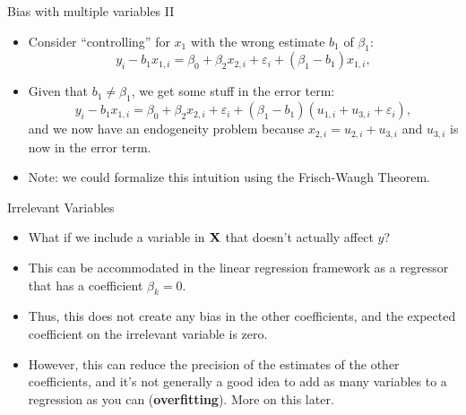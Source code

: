 \documentclass[aspectratio=169,11pt]{beamer}
\begin{document}
\begin{frame}{Bias with multiple variables II}
\begin{itemize}
		\item Consider ``controlling'' for $x_1$ with the wrong estimate $b_1$ of $\beta_1$:\[
					y_i - b_1 x_{1,i} = \beta_0 + \beta_2 x_{2,i}  + \varepsilon_i + (\beta_1 - b_1) x_{1,i},
\]

\medskip
		\item Given that $b_1 \ne \beta_1$, we get some stuff in the error term:\[
					y_i - b_1 x_{1,i} = \beta_0 + \beta_2 x_{2,i}  + \varepsilon_i + (\beta_1 - b_1) (u_{1,i} + u_{3,i} + \varepsilon_i),
\]
and we now have an endogeneity problem because $x_{2,i} = u_{2,i} + u_{3,i}$ and $u_{3,i}$ is now in the error term.

\medskip
\item Note: we could formalize this intuition using the Frisch-Waugh Theorem. 
\end{itemize}
\end{frame}


\begin{frame}{Irrelevant Variables}
\begin{itemize}
	\item What if we include a variable in ${\bf X}$ that doesn't actually
	affect $y$?

	\smallskip
	\item This can be accommodated in the linear regression framework as
	a regressor that has a coefficient $\beta_{k}=0$.

	\smallskip
	\item Thus, this does not create any bias in the other coefficients, and the 
	expected coefficient on the irrelevant variable is zero.

	\smallskip
	\item However, this can reduce the precision of the estimates of the 
	other coefficients, and it's not generally a good idea to add as many variables
	to a regression as you can ({\bf overfitting}). More on this later. 

	
\end{itemize}
\end{frame}
\end{document}
